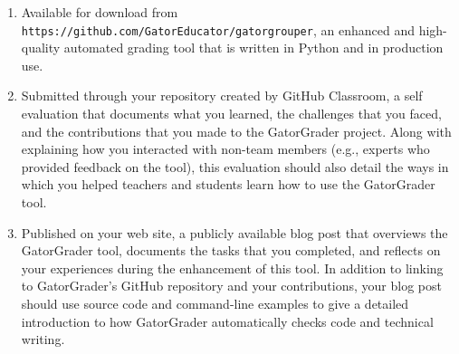 \documentclass[11pt]{article}
\newcommand{\url}[1]{\lstinline{#1}}
\begin{document}
\begin{enumerate}

\setlength{\itemsep}{0in}

\item Available for download from
  \url{https://github.com/GatorEducator/gatorgrouper}, an enhanced and
  high-quality automated grading tool that is written in Python and in
  production use.

\item Submitted through your repository created by GitHub Classroom, a self
  evaluation that documents what you learned, the challenges that you faced, and
  the contributions that you made to the GatorGrader project. Along with
  explaining how you interacted with non-team members (e.g., experts who
  provided feedback on the tool), this evaluation should also detail the ways in
  which you helped teachers and students learn how to use the GatorGrader tool.

\item Published on your web site, a publicly available blog post that overviews
  the GatorGrader tool, documents the tasks that you completed, and reflects on
  your experiences during the enhancement of this tool. In addition to linking
  to GatorGrader's GitHub repository and your contributions, your blog post
  should use source code and command-line examples to give a detailed
  introduction to how GatorGrader automatically checks code and technical
  writing.

\end{enumerate}
\end{document}
